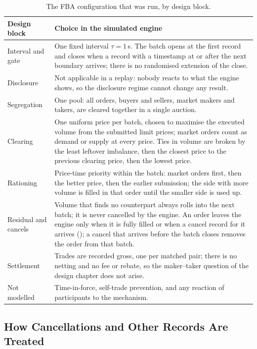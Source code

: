 \begin{table}[htbp]
\centering
\caption[FBA design choices]{The FBA configuration that was run, by design
block.}
\label{tab:fbachoices}
\small
\begin{tabularx}{\textwidth}{@{}p{2.9cm} L@{}}
\toprule
\textbf{Design block} & \textbf{Choice in the simulated engine}\\
\midrule
Interval and gate & One fixed interval $\tau=1$\,s. The batch opens at the first
record and closes when a record with a timestamp at or after the next boundary
arrives; there is no randomised extension of the close.\\
Disclosure & Not applicable in a replay: nobody reacts to what the engine shows,
so the disclosure regime cannot change any result.\\
Segregation & One pool: all orders, buyers and sellers, market makers and takers,
are cleared together in a single auction.\\
Clearing & One uniform price per batch, chosen to maximise the executed volume
from the submitted limit prices; market orders count as demand or supply at every
price. Ties in volume are broken by the least leftover imbalance, then the
closest price to the previous clearing price, then the lowest price.\\
Rationing & Price-time priority within the batch: market orders first, then the
better price, then the earlier submission; the side with more volume is filled in
that order until the smaller side is used up.\\
Residual and cancels & Volume that finds no counterpart always rolls into the
next batch; it is never cancelled by the engine. An order leaves the engine only
when it is fully filled or when a cancel record for it arrives
(); a cancel that arrives before the batch closes removes
the order from that batch.\\
Settlement & Trades are recorded gross, one per matched pair; there is no netting
and no fee or rebate, so the maker--taker question of the design chapter does not
arise.\\
Not modelled & Time-in-force, self-trade prevention, and any reaction of
participants to the mechanism.\\
\bottomrule
\end{tabularx}
\end{table}

\subsection{How Cancellations and Other Records Are Treated}
\label{sec:cancellations}

